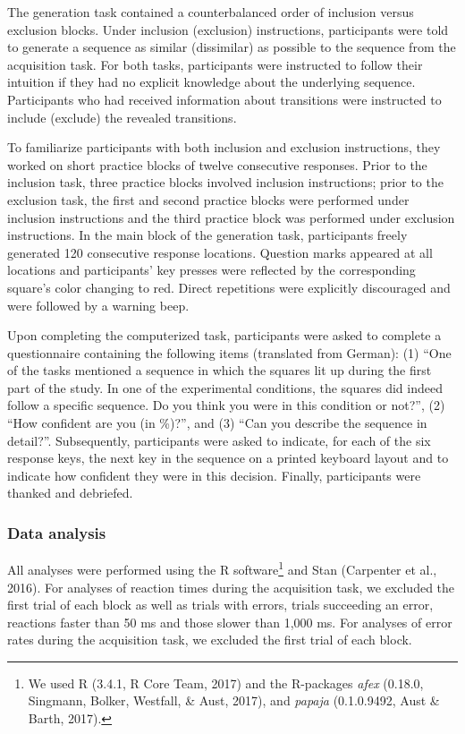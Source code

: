 \documentclass[jou]{apa6}
\theoremstyle{definition}
\theoremstyle{definition}
\theoremstyle{definition}
\theoremstyle{remark}
\begin{document}
The generation task contained a counterbalanced order of inclusion
versus exclusion blocks. Under inclusion (exclusion) instructions,
participants were told to generate a sequence as similar (dissimilar) as
possible to the sequence from the acquisition task. For both tasks,
participants were instructed to follow their intuition if they had no
explicit knowledge about the underlying sequence. Participants who had
received information about transitions were instructed to include
(exclude) the revealed transitions.

To familiarize participants with both inclusion and exclusion
instructions, they worked on short practice blocks of twelve consecutive
responses. Prior to the inclusion task, three practice blocks involved
inclusion instructions; prior to the exclusion task, the first and
second practice blocks were performed under inclusion instructions and
the third practice block was performed under exclusion instructions. In
the main block of the generation task, participants freely generated 120
consecutive response locations. Question marks appeared at all locations
and participants' key presses were reflected by the corresponding
square's color changing to red. Direct repetitions were explicitly
discouraged and were followed by a warning beep.

Upon completing the computerized task, participants were asked to
complete a questionnaire containing the following items (translated from
German): (1) \enquote{One of the tasks mentioned a sequence in which the
squares lit up during the first part of the study. In one of the
experimental conditions, the squares did indeed follow a specific
sequence. Do you think you were in this condition or not?}, (2)
\enquote{How confident are you (in \%)?}, and (3) \enquote{Can you
describe the sequence in detail?}. Subsequently, participants were asked
to indicate, for each of the six response keys, the next key in the
sequence on a printed keyboard layout and to indicate how confident they
were in this decision. Finally, participants were thanked and debriefed.

\subsubsection{Data analysis}\label{data-analysis}

All analyses were performed using the R software\footnote{We used R
  (3.4.1, R Core Team, 2017) and the R-packages \emph{afex} (0.18.0,
  Singmann, Bolker, Westfall, \& Aust, 2017), and \emph{papaja}
  (0.1.0.9492, Aust \& Barth, 2017).} and Stan (Carpenter et al., 2016).
For analyses of reaction times during the acquisition task, we excluded
the first trial of each block as well as trials with errors, trials
succeeding an error, reactions faster than 50 ms and those slower than
1,000 ms. For analyses of error rates during the acquisition task, we
excluded the first trial of each block.
\end{document}
